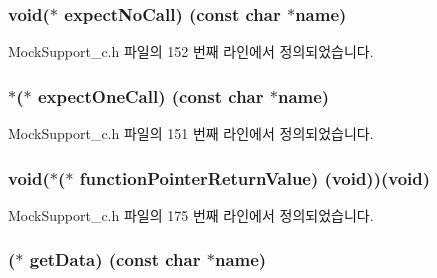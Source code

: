 \subsubsection[{\texorpdfstring{expect\+No\+Call}{expectNoCall}}]{\setlength{\rightskip}{0pt plus 5cm}void($\ast$ expect\+No\+Call) (const char $\ast$name)}\hypertarget{struct_s_mock_support__c_ab9567a3e193ee14b75607837dc2ead84}{}\label{struct_s_mock_support__c_ab9567a3e193ee14b75607837dc2ead84}


Mock\+Support\+\_\+c.\+h 파일의 152 번째 라인에서 정의되었습니다.

\subsubsection[{\texorpdfstring{expect\+One\+Call}{expectOneCall}}]{$\ast$($\ast$ expect\+One\+Call) (const char $\ast$name)}\hypertarget{struct_s_mock_support__c_acfa8991e97d6e09876346313d7b6ed39}{}\label{struct_s_mock_support__c_acfa8991e97d6e09876346313d7b6ed39}


Mock\+Support\+\_\+c.\+h 파일의 151 번째 라인에서 정의되었습니다.

\subsubsection[{\texorpdfstring{function\+Pointer\+Return\+Value}{functionPointerReturnValue}}]{\setlength{\rightskip}{0pt plus 5cm}void($\ast$($\ast$ function\+Pointer\+Return\+Value) (void))(void)}\hypertarget{struct_s_mock_support__c_a808d27a78eeec5e62fe36759b8da147b}{}\label{struct_s_mock_support__c_a808d27a78eeec5e62fe36759b8da147b}


Mock\+Support\+\_\+c.\+h 파일의 175 번째 라인에서 정의되었습니다.

\subsubsection[{\texorpdfstring{get\+Data}{getData}}]{($\ast$ get\+Data) (const char $\ast$name)}\hypertarget{struct_s_mock_support__c_ab98102a109f9c5acce0c5dd43f6f1dc8}{}\label{struct_s_mock_support__c_ab98102a109f9c5acce0c5dd43f6f1dc8}


